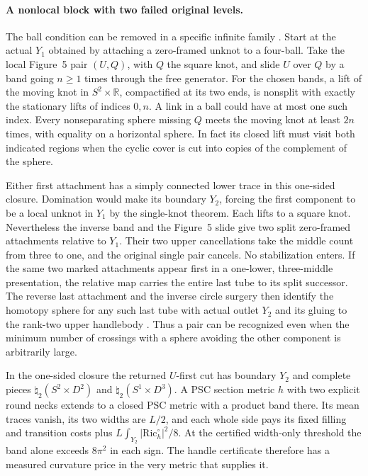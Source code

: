 \documentclass[11pt,letterpaper]{article}
\numberwithin{equation}{section}
\newcommand{\R}{\mathbb R}
\begin{document}
\paragraph{A nonlocal block with two failed original levels.}
The ball condition can be removed in a specific infinite family
\cite{Baker2026HandleCuts}. Start at the actual \(Y_1\) obtained
by attaching a zero-framed unknot to a four-ball. Take the local
Figure~5 pair \((U,Q)\), with \(Q\) the square knot, and slide \(U\)
over \(Q\) by a band going \(n\ge1\) times through the free
generator. For the chosen bands, a lift of the moving knot in
\(S^2\times\R\), compactified at its two ends, is nonsplit with
exactly the stationary lifts of indices \(0,n\). A link in a ball
could have at most one such index. Every nonseparating sphere
missing \(Q\) meets the moving knot at least \(2n\) times, with
equality on a horizontal sphere. In fact its closed lift must
visit both indicated regions when the cyclic cover is cut into
copies of the complement of the sphere.

Either first attachment has a simply connected lower trace in this
one-sided closure. Domination would make its boundary \(Y_2\),
forcing the first component to be a local unknot in \(Y_1\) by
the single-knot theorem. Each lifts to a square knot. Nevertheless
the inverse band and the Figure~5 slide give two split zero-framed
attachments relative to \(Y_1\). Their two upper cancellations take
the middle count from three to one, and the original single pair
cancels. No stabilization enters. If the same two marked attachments
appear first in a one-lower, three-middle presentation, the relative
map carries the entire last tube to its split successor. The
reverse last attachment and the inverse circle surgery then identify
the homotopy sphere for any such last tube with actual outlet \(Y_2\)
and its gluing to the rank-two upper handlebody
\cite{Baker2026HandleCuts}. Thus a pair can be recognized even when
the minimum number of crossings with a sphere avoiding the other
component is arbitrarily large.

In the one-sided closure the returned \(U\)-first cut has boundary
\(Y_2\) and complete pieces \(\natural_2(S^2\times D^2)\) and
\(\natural_2(S^1\times D^3)\). A PSC section metric \(h\) with two
explicit round necks extends to a closed PSC metric with a product
band there. Its mean traces vanish, its two widths are \(L/2\),
and each whole side pays its fixed filling and transition costs
plus \(L\int_{Y_2}|\mathrm{Ric}_h^\circ|^2/8\). At the certified
width-only threshold the band alone exceeds \(8\pi^2\) in each
sign. The handle certificate therefore has a measured curvature
price in the very metric that supplies it.
\end{document}

